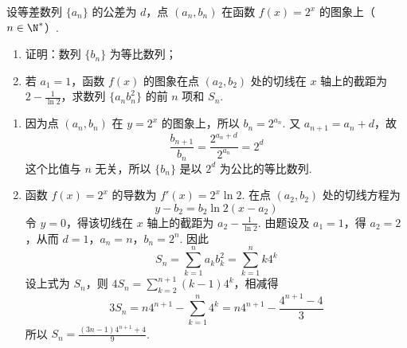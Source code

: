 \begin{problem}
设等差数列 \(\{a_{n}\}\) 的公差为 \(d\)，点 \((a_{n}, b_{n})\) 在函数 \(f(x) = 2^{x}\) 的图象上（\(n \in \N^{*}\)）.

\begin{enumerate}
\item 证明：数列 \(\{b_{n}\}\) 为等比数列；
\item 若 \(a_{1} = 1\)，函数 \(f(x)\) 的图象在点 \((a_{2}, b_{2})\) 处的切线在 \(x\) 轴上的截距为 \(2 - \frac{1}{\ln 2}\)，求数列 \(\{a_{n} b_{n}^{2}\}\) 的前 \(n\) 项和 \(S_{n}\).
\end{enumerate}

\begin{solution}
\begin{enumerate}
\item 因为点 \((a_n,b_n)\) 在 \(y=2^x\) 的图象上，所以 \(b_n=2^{a_n}\). 又 \(a_{n+1}=a_n+d\)，故
\[
\frac{b_{n+1}}{b_n}=\frac{2^{a_n+d}}{2^{a_n}}=2^d
\]
这个比值与 \(n\) 无关，所以 \(\{b_n\}\) 是以 \(2^d\) 为公比的等比数列.
\item 函数 \(f(x)=2^x\) 的导数为 \(f'(x)=2^x\ln2\). 在点 \((a_2,b_2)\) 处的切线方程为
\[
y-b_2=b_2\ln2\left(x-a_2\right)
\]
令 \(y=0\)，得该切线在 \(x\) 轴上的截距为 \(a_2-\frac1{\ln2}\). 由题设及 \(a_1=1\)，得 \(a_2=2\)，从而 \(d=1\)，\(a_n=n\)，\(b_n=2^n\). 因此
\[
S_n=\sum_{k=1}^n a_kb_k^2=\sum_{k=1}^n k4^k
\]
设上式为 \(S_n\)，则 \(4S_n=\sum_{k=2}^{n+1}(k-1)4^k\)，相减得
\[
3S_n=n4^{n+1}-\sum_{k=1}^n4^k=n4^{n+1}-\frac{4^{n+1}-4}{3}
\]
所以 \(S_n=\frac{(3n-1)4^{n+1}+4}{9}\).
\end{enumerate}
\end{solution}
\end{problem}

